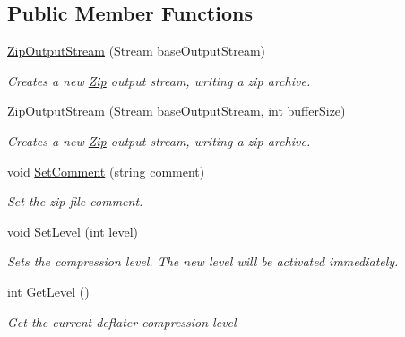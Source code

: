 \subsection*{Public Member Functions}
\begin{DoxyCompactItemize}
\item 
\hyperlink{class_i_c_sharp_code_1_1_sharp_zip_lib_1_1_zip_1_1_zip_output_stream_a19fba03baf9f8523b17358da692fe8a6}{Zip\+Output\+Stream} (Stream base\+Output\+Stream)
\begin{DoxyCompactList}\small\item\em Creates a new \hyperlink{namespace_i_c_sharp_code_1_1_sharp_zip_lib_1_1_zip}{Zip} output stream, writing a zip archive. \end{DoxyCompactList}\item 
\hyperlink{class_i_c_sharp_code_1_1_sharp_zip_lib_1_1_zip_1_1_zip_output_stream_a063fe079e43f665253478472c7ab39a3}{Zip\+Output\+Stream} (Stream base\+Output\+Stream, int buffer\+Size)
\begin{DoxyCompactList}\small\item\em Creates a new \hyperlink{namespace_i_c_sharp_code_1_1_sharp_zip_lib_1_1_zip}{Zip} output stream, writing a zip archive. \end{DoxyCompactList}\item 
void \hyperlink{class_i_c_sharp_code_1_1_sharp_zip_lib_1_1_zip_1_1_zip_output_stream_afb5f98da9635086a3836764e7daf4047}{Set\+Comment} (string comment)
\begin{DoxyCompactList}\small\item\em Set the zip file comment. \end{DoxyCompactList}\item 
void \hyperlink{class_i_c_sharp_code_1_1_sharp_zip_lib_1_1_zip_1_1_zip_output_stream_a4ec27661acea8617a722f24abf8fe7b0}{Set\+Level} (int level)
\begin{DoxyCompactList}\small\item\em Sets the compression level. The new level will be activated immediately. \end{DoxyCompactList}\item 
int \hyperlink{class_i_c_sharp_code_1_1_sharp_zip_lib_1_1_zip_1_1_zip_output_stream_aac2f1bfe79b9ed9d53d2f7422b45593d}{Get\+Level} ()
\begin{DoxyCompactList}\small\item\em Get the current deflater compression level \end{DoxyCompactList}\item 

\end{DoxyCompactItemize}
